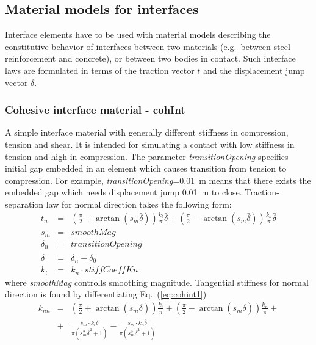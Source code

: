 \documentclass[a4paper]{article}
\newcommand{\param}[1]{{\it #1}}
\begin{document}
\clearpage

\subsection{Material models for interfaces}

Interface elements have to be used with material models describing
the constitutive behavior of interfaces between two materials 
(e.g.\ between steel reinforcement and concrete),
or between two bodies in contact.
Such interface laws are formulated in terms of the traction vector $t$ and the displacement jump vector $\delta$.

\subsubsection{Cohesive interface material - cohInt}
A simple interface material with generally different stiffness in compression, tension and shear. It is intended for simulating a contact with low stiffness in tension and high in compression. The parameter \param{transitionOpening} specifies initial gap embedded in an element which causes transition from tension to compression. For example, \param{transitionOpening}=0.01~m means that there exists the embedded gap which needs displacement jump 0.01~m to close. Traction-separation law for normal direction takes the following form:
\begin{eqnarray}
t_n &=& \left (\frac{\pi}{2} + \arctan (s_m \bar\delta)\right) \frac{k_t}{\pi} \bar\delta + \left (\frac{\pi}{2} - \arctan (s_m \bar\delta)\right) \frac{k_n}{\pi} \bar\delta\label{eq:cohint1}\\
s_m &=& \mathit{smoothMag}\\
\delta_0 &=& \mathit{transitionOpening}\\
\bar\delta &=& \delta_n + \delta_0\\
k_t &=& k_n \cdot \mathit{stiffCoeffKn}
\end{eqnarray}
where \param{smoothMag} controlls smoothing magnitude. Tangential stiffness for normal direction is found by differentiating Eq.~(\ref{eq:cohint1})
\begin{eqnarray}
k_{nn} &=& \left (\frac{\pi}{2} + \arctan (s_m \bar\delta)\right) \frac{k_t}{\pi} + \left (\frac{\pi}{2} - \arctan (s_m \bar\delta)\right) \frac{k_n}{\pi} +\\
&+& \frac{s_m \cdot k_t \bar\delta}{\pi(s_m^2\bar\delta^2+1)} - \frac{s_m \cdot k_n \bar\delta}{\pi(s_m^2\bar\delta^2+1)}
\end{eqnarray}
\end{document}
